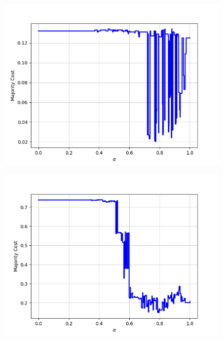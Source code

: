 \begin{figure}[h]
\begin{minipage}{.24\textwidth}
  {\includegraphics[width=\linewidth]{plots/nell-sc/game}}
\end{minipage}
\begin{minipage}{.24\textwidth}
  \centering
  {\includegraphics[width=\linewidth]{plots/nell-sc/householditem}}
\end{minipage}
\begin{minipage}{.24\textwidth}
  \centering

\end{minipage}
\end{figure}

